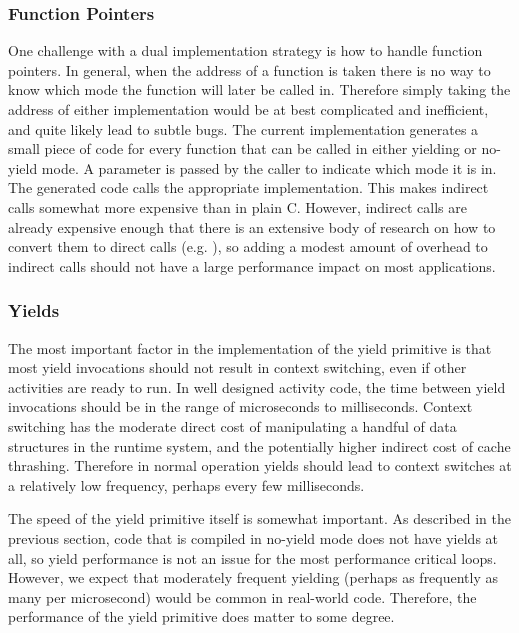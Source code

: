 \documentclass[9pt,preprint]{sigplanconf}
\begin{document}

\subsubsection{Function Pointers}

One challenge with a dual implementation strategy is how to handle function pointers.
In general, when the address of a function is taken there is no way to know which mode the function will later be called in.
Therefore simply taking the address of either implementation would be at best complicated and inefficient, and quite likely lead to subtle bugs.
The current implementation generates a small piece of code for every function that can be called in either yielding or no-yield mode.
A parameter is passed by the caller to indicate which mode it is in.
The generated code calls the appropriate implementation.
This makes indirect calls somewhat more expensive than in plain C.
However, indirect calls are already expensive enough that there is an extensive body of research on how to convert them to direct calls (e.g. \cite{Dean1995}), so adding a modest amount of overhead to indirect calls should not have a large performance impact on most applications.

\subsubsection{Yields}

The most important factor in the implementation of the yield primitive is that most yield invocations should not result in context switching, even if other activities are ready to run.
In well designed activity code, the time between yield invocations should be in the range of microseconds to milliseconds.
Context switching has the moderate direct cost of manipulating a handful of data structures in the runtime system, and the potentially higher indirect cost of cache thrashing.
Therefore in normal operation yields should lead to context switches at a relatively low frequency, perhaps every few milliseconds.

The speed of the yield primitive itself is somewhat important.
As described in the previous section, code that is compiled in no-yield mode does not have yields at all, so yield performance is not an issue for the most performance critical loops.
However, we expect that moderately frequent yielding (perhaps as frequently as many per microsecond) would be common in real-world code.
Therefore, the performance of the yield primitive does matter to some degree.
\end{document}
